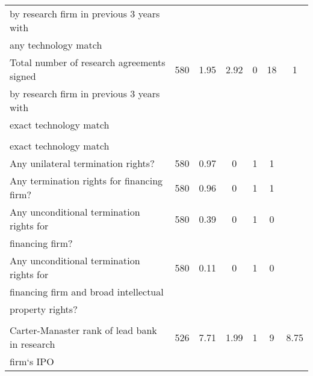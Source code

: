 \begin{tabular}{lcccccc}
\quad by research firm in previous 3 years with\\
\quad any technology match\\
Total number of research agreements signed &580 &1.95& 2.92 &0 &18 &1\\
\quad by research firm in previous 3 years with \\
\quad exact technology match \\ 
\\
\quad exact technology match \\
Any unilateral termination rights?&580 &0.97 &0 &1 &1\\
Any termination rights for financing firm?&580& 0.96& 0 &1 &1\\
Any unconditional termination rights for&580& 0.39 &0& 1& 0 \\
\quad financing firm?\\
Any unconditional termination rights for&580& 0.11 &0 &1& 0\\
\quad financing firm and broad intellectual\\
\quad property rights?\\
\\ Carter-Manaster rank of lead bank in research&526& 7.71 &1.99 &1 &9 &8.75 \\
\quad firm`s IPO\\ \hline
\end{tabular}